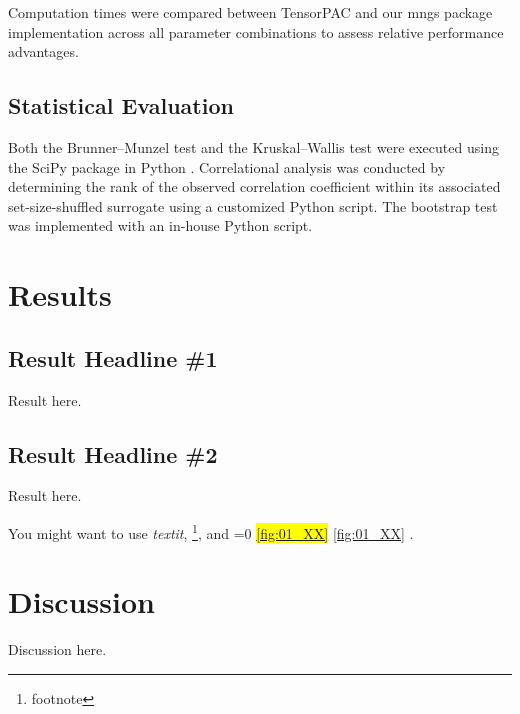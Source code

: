 \documentclass[preprint,review,12pt]{elsarticle}%
\newcommand{\hl}[1]{\colorbox{yellow}{#1}}
\newcommand{\hlref}[1]{%
  \ifnum\getrefnumber{#1}=0
    \hl{\ref*{#1}}%
  \else
    \ref{#1}%
  \fi
}
\begin{document}
Computation times were compared between TensorPAC and our mngs package implementation across all parameter combinations to assess relative performance advantages.



\subsection{Statistical Evaluation}
Both the Brunner--Munzel test and the Kruskal--Wallis test were executed using the SciPy package in Python \cite{virtanen_scipy_2020}. Correlational analysis was conducted by determining the rank of the observed correlation coefficient within its associated set-size-shuffled surrogate using a customized Python script. The bootstrap test was implemented with an in-house Python script.
\label{sec:methods}


\section{Results}
\subsection{Result Headline \#1}
Result here.

\subsection{Result Headline \#2}
Result here.

You might want to use \textit{textit}, \footnote{footnote}, and \hlref{fig:01_XX}.

\label{sec:results}

\section{Discussion}
Discussion here.
\label{sec:discussion}


\end{document}
